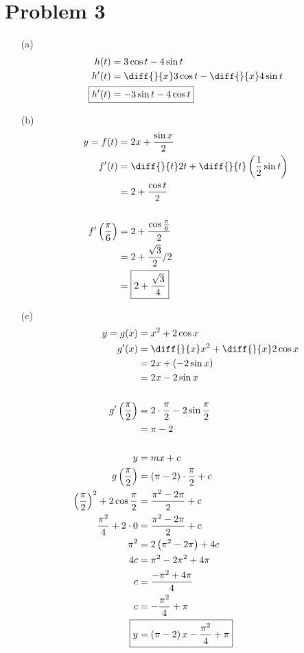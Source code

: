 \documentclass{article}
\begin{document}
\section*{Problem 3}
\begin{itemize}
\item[(a)]
    \begin{align*}
        h(t)&=3\cos t-4\sin t \\
        h'(t)&=\diff{}{x}3\cos t-\diff{}{x}4\sin t \\
        \Aboxed{h'(t)&=-3\sin t-4\cos t}
    \end{align*}

\item[(b)]
    \begin{align*}
        y=f(t)&=2x+\frac{\sin x}{2} \\
        f'(t)&=\diff{}{t}2t+\diff{}{t}\left(\frac{1}{2}\sin t\right) \\
        &=2+\frac{\cos t}{2} \\
        \\
        f'\left(\frac{\pi}{6}\right)&=2+\frac{\cos\frac{\pi}{6}}{2} \\
        &=2+\frac{\sqrt{3}}{2}/2 \\
        &=\boxed{2+\frac{\sqrt{3}}{4}} \\
    \end{align*}

\item[(c)]
    \begin{align*}
        y=g(x)&=x^2+2\cos x \\
        g'(x)&=\diff{}{x}x^2+\diff{}{x}2\cos x\\
        &=2x+\left(-2\sin x\right) \\
        &=2x-2\sin x \\
        \\
        g'\left(\frac{\pi}{2}\right)&=2\cdot\frac{\pi}{2}-2\sin\frac{\pi}{2} \\
        &=\pi-2 \\
        \\
        y&=mx+c \\
        g\left(\frac{\pi}{2}\right)&=\left(\pi-2\right)\cdot\frac{\pi}{2}+c \\
        \left(\frac{\pi}{2}\right)^2+2\cos\frac{\pi}{2}&=\frac{\pi^2-2\pi}{2}+c \\
        \frac{\pi^2}{4}+2\cdot0&=\frac{\pi^2-2\pi}{2}+c \\
        \pi^2&=2\left(\pi^2-2\pi\right)+4c \\
        4c&=\pi^2-2\pi^2+4\pi \\
        c&=\frac{-\pi^2+4\pi}{4} \\
        c&=-\frac{\pi^{2}}{4}+\pi \\
        \Aboxed{y&=\left(\pi-2\right)x-\frac{\pi^2}{4}+\pi}
    \end{align*}


\end{itemize}
\end{document}
